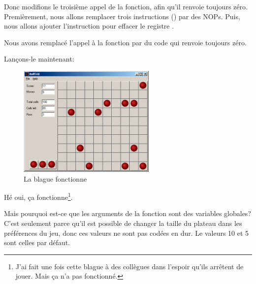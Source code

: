 Donc modifions le troisième appel de la fonction, afin qu'il renvoie toujours zéro.
Premièrement, nous allons remplacer trois instructions () par des \ac{NOP}s.
Puis, nous allons ajouter l'instruction  pour effacer le registre
\EAX.



Nous avons remplacé l'appel à la fonction  par du code qui renvoie toujours
zéro.

\clearpage
Lançons-le maintenant:

\begin{figure}[H]
\centering
\includegraphics[width=0.6\textwidth]{examples/lines/2.png}
\caption{La blague fonctionne}
\end{figure}

Hé oui, ça fonctionne\footnote{J'ai fait une fois cette blague à des collègues dans
l'espoir qu'ils arrêtent de jouer. Mais ça n'a pas fonctionné.}.

Mais pourquoi est-ce que les arguments de la fonction  sont des variables
globales?
C'est seulement parce qu'il est possible de changer la taille du plateau dans les
préférences du jeu, donc ces valeurs ne sont pas codées en dur.
Le valeurs 10 et 5 sont celles par défaut.
